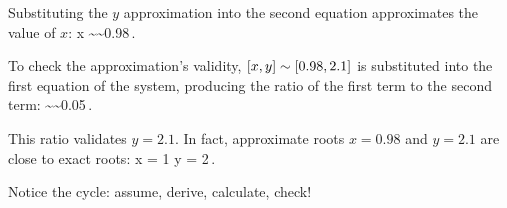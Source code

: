 Substituting the $y$ approximation into the second equation approximates the value of $x$:
\beq
x \sim{}\sim 0.98\,.
\eeq

To check the approximation's validity, $\left[{x,y}\right]\sim\left[{0.98,2.1}\right]$ is substituted into the first equation of the system, producing the ratio of the first term to the second term:
\beq
{}\sim{}\sim 0.05\,.
\eeq

This ratio validates $y = 2.1$. In fact, approximate roots $x = 0.98$ and $y = 2.1$ are close to exact roots:
\beq
x = 1\qquad{}\qquad
y = 2\,.
\eeq

Notice the cycle: assume, derive, calculate, check!

